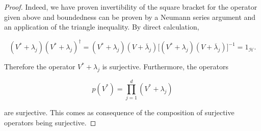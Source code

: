 \documentclass[10pt,a4paper]{amsart}
\begin{document}
\begin{proof}
\noindent Indeed, we have proven invertibility of the square bracket for the operator given above and boundedness can be proven by a Neumann series argument and an application of the triangle inequality. By direct calculation,


$$(V^{*}+\lambda_{j})(V^{*}+\lambda_{j})^{\dagger}
    =(V^{*}+\lambda_{j})(V+\overline{\lambda}_{j})\bigg[(V^{*}+\lambda_{j})(V+\overline{\lambda}_{j})\bigg]^{-1} 
    = 1_{\mathcal{H}}.$$

\noindent Therefore the operator $V^{*}+\lambda_{j}$ is surjective. Furthermore, the operators

$$p(V^{*}) = \prod_{j=1}^{d}(V^{*}+\lambda_{j})$$

\noindent are surjective. This comes as consequence of the composition of surjective operators being surjective.\end{proof}
\end{document}
